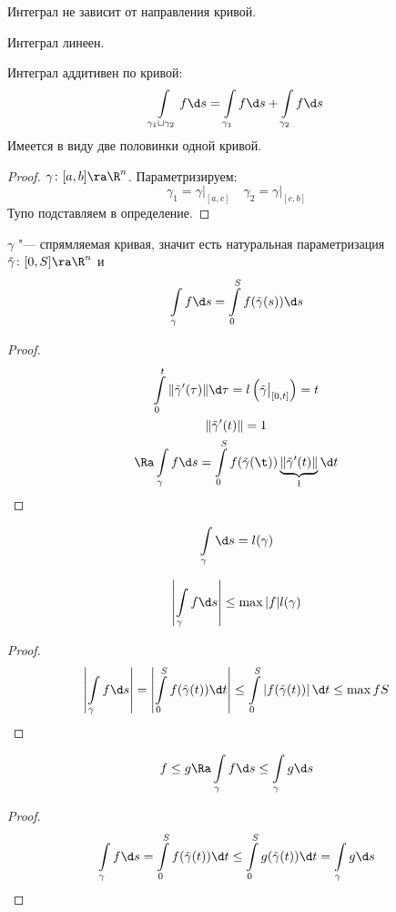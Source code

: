 \item
	Интеграл не зависит от направления кривой.

\item
	Интеграл линеен.

\item
	Интеграл аддитивен по кривой:
	\[ \int\limits_{\gamma_1 \sqcup \gamma_2} f \d s = \int\limits_{\gamma_1} f \d s + \int\limits_{\gamma_2} f \d s \]
	Имеется в виду две половинки одной кривой.
	\begin{proof}
		$\gamma\colon [a, b] \ra \R^n$.
		Параметризируем:
		\[ \gamma_1 = \gamma \bigr|_{[a, c]} \quad \gamma_2 = \gamma \bigr|_{[c, b]} \]
		Тупо подставляем в определение.
	\end{proof}

\item
	$\gamma$ "--- спрямляемая кривая, значит есть натуральная параметризация $\tilde \gamma\colon [0, S] \ra \R^n$ и
	\[ \int\limits_\gamma f \d s = \int\limits_0^S f(\tilde \gamma(s)) \d s \]
	\begin{proof}
		\begin{gather*}
			\int\limits_0^t \|\tilde\gamma'(\tau)\| \d \tau = l\left(\tilde \gamma \bigr|_{[0, t]}\right) = t \\
			\|\tilde\gamma'(t)\| = 1 \\
			\Ra \int\limits_\gamma f \d s = \int\limits_0^S f(\tilde\gamma(\t)) \underbrace{\|\tilde\gamma'(t)\|}_1 \d t
		\end{gather*}
	\end{proof}

\item
	\[ \int\limits_\gamma \d s = l(\gamma) \]

\item
	\[ \left| \int\limits_\gamma f \d s \right| \le \max |f| l(\gamma) \]
	\begin{proof}
		\begin{gather*}
			\left| \int\limits_\gamma f \d s \right|
			= \left| \int\limits_0^S f(\tilde\gamma(t)) \d t \right|
			\le \int\limits_0^S \left| f(\tilde\gamma(t)) \right| \d t \le \max f S
		\end{gather*}
	\end{proof}

\item
	\[ f \le g \Ra \int\limits_\gamma f \d s \le \int\limits_\gamma g \d s \]
	\begin{proof}
		\[
			\int\limits_\gamma f \d s = \int\limits_0^S f(\tilde\gamma(t)) \d t
			\le \int\limits_0^S g(\tilde\gamma(t)) \d t = \int\limits_\gamma g \d s
		\]
	\end{proof}

